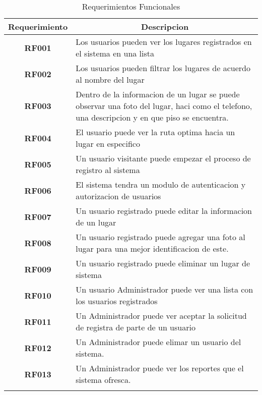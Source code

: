     \begin{longtable}{ c  X }
      \toprule
        \textbf{Requerimiento} &
        \multicolumn{1}{c}{\textbf{Descripcion}}\\

      \midrule
      \endhead

\addlinespace
\textbf{RF001}
&
Los usuarios pueden ver los lugares registrados en el sistema en una lista
\\

\addlinespace
\textbf{RF002}
&
Los usuarios pueden filtrar los lugares de acuerdo al nombre del lugar
\\

\addlinespace
\textbf{RF003}
&
Dentro de la informacion de un lugar se puede observar una foto del lugar, haci como el telefono, una descripcion y en que piso se encuentra.
\\

\addlinespace
\textbf{RF004}
&
El usuario puede ver la ruta optima hacia un lugar en especifico
\\

\addlinespace
\textbf{RF005}
&
Un usuario visitante puede empezar el proceso de registro al sistema
\\


\addlinespace
\textbf{RF006}
&
El sistema tendra un modulo de autenticacion y autorizacion de usuarios
\\

\addlinespace
\textbf{RF007}
&
Un usuario registrado puede editar la informacion de un lugar
\\

\addlinespace
\textbf{RF008}
&
Un usuario registrado puede agregar una foto al lugar para una mejor identificacion de este.
\\


\addlinespace
\textbf{RF009}
&
Un usuario registrado puede eliminar un lugar de sistema
\\


\addlinespace
\textbf{RF010}
&
Un usuario Administrador puede ver una lista con los usuarios registrados
\\


\addlinespace
\textbf{RF011}
&
Un Administrador puede ver aceptar la solicitud de registra de parte de un usuario
\\


\addlinespace
\textbf{RF012}
&
Un Administrador puede elimar un usuario del sistema.
\\

\addlinespace
\textbf{RF013}
&
Un Administrador puede ver los reportes que el sistema ofresca.
\\


      \bottomrule
      \caption{Requerimientos Funcionales}
      \label{tab:requerimientos funcionales}
    \end{longtable}

